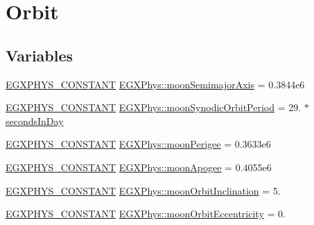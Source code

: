 \hypertarget{group___e_g_x_phys-_constants-_astrophysics-_solar_system-_moon-_orbit}{}\section{Orbit}
\label{group___e_g_x_phys-_constants-_astrophysics-_solar_system-_moon-_orbit}
\subsection*{Variables}
\begin{DoxyCompactItemize}
\item 
\mbox{\hyperlink{group___e_g_x_phys-_constants-_macros_ga76980d288494ce1714c9ac68a95ba702}{E\+G\+X\+P\+H\+Y\+S\+\_\+\+C\+O\+N\+S\+T\+A\+NT}} \mbox{\hyperlink{group___e_g_x_phys-_constants-_astrophysics-_solar_system-_moon-_orbit_ga1fac63237134644c174ae48640be1fdc}{E\+G\+X\+Phys\+::moon\+Semimajor\+Axis}} = 0.\+3844e6
\item 
\mbox{\hyperlink{group___e_g_x_phys-_constants-_macros_ga76980d288494ce1714c9ac68a95ba702}{E\+G\+X\+P\+H\+Y\+S\+\_\+\+C\+O\+N\+S\+T\+A\+NT}} \mbox{\hyperlink{group___e_g_x_phys-_constants-_astrophysics-_solar_system-_moon-_orbit_ga2748ff6079aec4fd22f47b1534005b80}{E\+G\+X\+Phys\+::moon\+Synodic\+Orbit\+Period}} = 29. $\ast$ \mbox{\hyperlink{namespace_e_g_x_phys_a93d2a00d75411b58cbf63ab3fd1f8bc2}{seconds\+In\+Day}}
\item 
\mbox{\hyperlink{group___e_g_x_phys-_constants-_macros_ga76980d288494ce1714c9ac68a95ba702}{E\+G\+X\+P\+H\+Y\+S\+\_\+\+C\+O\+N\+S\+T\+A\+NT}} \mbox{\hyperlink{group___e_g_x_phys-_constants-_astrophysics-_solar_system-_moon-_orbit_ga3ac548dafccbac7cc3c79169fb0503a9}{E\+G\+X\+Phys\+::moon\+Perigee}} = 0.\+3633e6
\item 
\mbox{\hyperlink{group___e_g_x_phys-_constants-_macros_ga76980d288494ce1714c9ac68a95ba702}{E\+G\+X\+P\+H\+Y\+S\+\_\+\+C\+O\+N\+S\+T\+A\+NT}} \mbox{\hyperlink{group___e_g_x_phys-_constants-_astrophysics-_solar_system-_moon-_orbit_ga5d0c2e897e5b6b30409b046e37dd275e}{E\+G\+X\+Phys\+::moon\+Apogee}} = 0.\+4055e6
\item 
\mbox{\hyperlink{group___e_g_x_phys-_constants-_macros_ga76980d288494ce1714c9ac68a95ba702}{E\+G\+X\+P\+H\+Y\+S\+\_\+\+C\+O\+N\+S\+T\+A\+NT}} \mbox{\hyperlink{group___e_g_x_phys-_constants-_astrophysics-_solar_system-_moon-_orbit_ga74ae6998e1519bfd3f0e52fd2788adde}{E\+G\+X\+Phys\+::moon\+Orbit\+Inclination}} = 5.
\item 
\mbox{\hyperlink{group___e_g_x_phys-_constants-_macros_ga76980d288494ce1714c9ac68a95ba702}{E\+G\+X\+P\+H\+Y\+S\+\_\+\+C\+O\+N\+S\+T\+A\+NT}} \mbox{\hyperlink{group___e_g_x_phys-_constants-_astrophysics-_solar_system-_moon-_orbit_gae101303590e8bd4e5d0a4f895e9cbd7a}{E\+G\+X\+Phys\+::moon\+Orbit\+Eccentricity}} = 0.

\end{DoxyCompactItemize}
